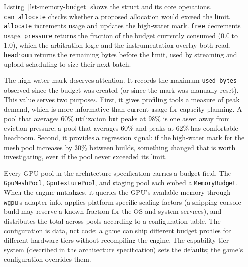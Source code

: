 \documentclass[
  11pt,
  letterpaper,
  DIV=11,
  numbers=noendperiod,
  twoside,
  open=right]{scrreprt}
\newenvironment{Shaded}{}{}
\newcommand{\DataTypeTok}[1]{\textcolor[rgb]{0.84,0.23,0.29}{#1}}
\newcommand{\KeywordTok}[1]{\textcolor[rgb]{0.84,0.23,0.29}{#1}}
\newcommand{\NormalTok}[1]{\textcolor[rgb]{0.14,0.16,0.18}{#1}}
\newcommand{\OperatorTok}[1]{\textcolor[rgb]{0.14,0.16,0.18}{#1}}
\renewenvironment{Shaded}{\begin{snugshade}\small\setstretch{0.95}}{\end{snugshade}}
\begin{document}
%

Listing~\ref{lst-memory-budget} shows the struct and its core
operations. \texttt{can\_allocate} checks whether a proposed allocation
would exceed the limit. \texttt{allocate} increments usage and updates
the high-water mark. \texttt{free} decrements usage. \texttt{pressure}
returns the fraction of the budget currently consumed (0.0 to 1.0),
which the arbitration logic and the instrumentation overlay both read.
\texttt{headroom} returns the remaining bytes before the limit, used by
streaming and upload scheduling to size their next batch.

The high-water mark deserves attention. It records the maximum
\texttt{used\_bytes} observed since the budget was created (or since the
mark was manually reset). This value serves two purposes. First, it
gives profiling tools a measure of peak demand, which is more
informative than current usage for capacity planning. A pool that
averages 60\% utilization but peaks at 98\% is one asset away from
eviction pressure; a pool that averages 60\% and peaks at 62\% has
comfortable headroom. Second, it provides a regression signal: if the
high-water mark for the mesh pool increases by 30\% between builds,
something changed that is worth investigating, even if the pool never
exceeded its limit.

Every GPU pool in the architecture specification carries a budget field.
The \texttt{GpuMeshPool}, \texttt{GpuTexturePool}, and staging pool each
embed a \texttt{MemoryBudget}. When the engine initializes, it queries
the GPU's available memory through \texttt{wgpu}'s adapter info, applies
platform-specific scaling factors (a shipping console build may reserve
a known fraction for the OS and system services), and distributes the
total across pools according to a configuration table. The configuration
is data, not code: a game can ship different budget profiles for
different hardware tiers without recompiling the engine. The capability
tier system (described in the architecture specification) sets the
defaults; the game's configuration overrides them.
\end{document}
